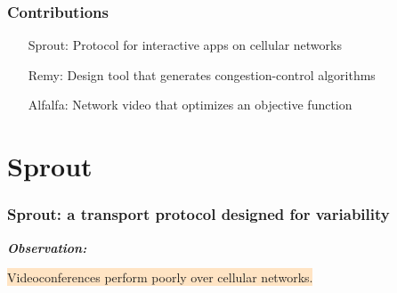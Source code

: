 \documentclass[svgnames]{beamer}
\begin{document}
\begin{frame}
\frametitle{Contributions}

\begin{itemize}

\item[Sprout:] Protocol for interactive apps on cellular networks


\item[]

\item[Remy:] Design tool that generates congestion-control algorithms



%
%

\item[]

\item[Alfalfa:] Network video that optimizes an objective function


\end{itemize}

\end{frame}

\section{Sprout}

\begin{frame}
\frametitle{Sprout: a transport protocol designed for variability}

\large

\textit{\bf Observation:}

\hspace{10 pt} \colorbox{Bisque}{Videoconferences perform poorly over cellular networks.}

\vspace{\baselineskip}

\end{frame}
\end{document}
